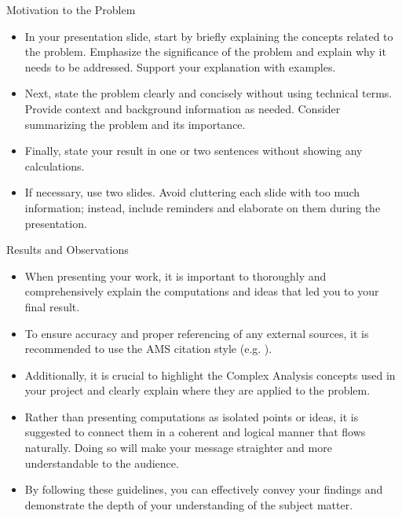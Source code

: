 \documentclass{beamer}
\begin{document}
\begin{frame}{Motivation to the Problem}
\begin{itemize}
   \item[] In your presentation slide, start by briefly explaining the concepts related to the problem. Emphasize the significance of the problem and explain why it needs to be addressed. Support your explanation with examples.\medskip
   
   \item[] Next, state the problem clearly and concisely without using technical terms. Provide context and background information as needed. Consider summarizing the problem and its importance.\medskip

   \item[] Finally, state your result in one or two sentences without showing any calculations.\medskip

   \item[] If necessary, use two slides. Avoid cluttering each slide with too much information; instead, include reminders and elaborate on them during the presentation.
\end{itemize}
   \end{frame}
\begin{frame}{Results and Observations}
    \begin{itemize}
        \item[] When presenting your work, it is important to thoroughly and comprehensively explain the computations and ideas that led you to your final result. \medskip

        \item[] To ensure accuracy and proper referencing of any external sources, it is recommended to use the AMS citation style (e.g. \cite{bambico2022generalization}).\medskip

        \item[] Additionally, it is crucial to highlight the Complex Analysis concepts used in your project and clearly explain where they are applied to the problem.\medskip 

        \item[] Rather than presenting computations as isolated points or ideas, it is suggested to connect them in a coherent and logical manner that flows naturally. Doing so will make your message straighter and more understandable to the audience.\medskip 

        \item[] By following these guidelines, you can effectively convey your findings and demonstrate the depth of your understanding of the subject matter.
    \end{itemize}
\end{frame}
\end{document}

